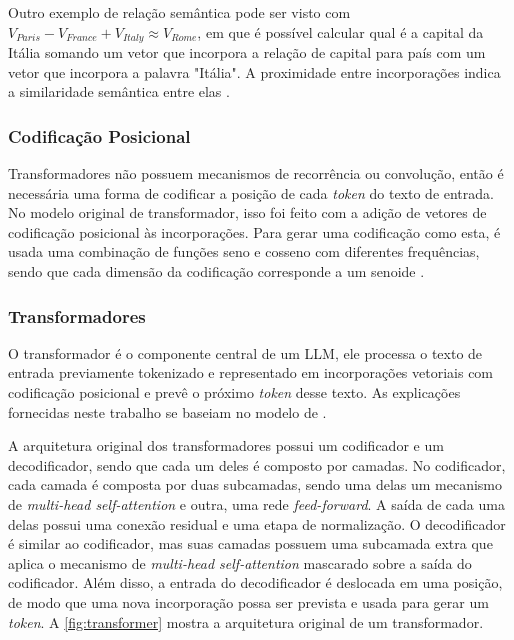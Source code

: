 Outro exemplo de relação semântica pode ser visto com \begin{math}V_{Paris} - V_{France} + V_{Italy} \approx V_{Rome}\end{math}, em que é possível calcular qual é a
capital da Itália somando um vetor que incorpora a relação de capital para país com um vetor que incorpora a palavra "Itália". A proximidade entre incorporações indica a
similaridade semântica entre elas \cite{word2vec_estimation}.

\subsubsection{Codificação Posicional}

Transformadores não possuem mecanismos de recorrência ou convolução, então é necessária uma forma de codificar a posição de cada \textit{token} do texto de entrada. No
modelo original de transformador, isso foi feito com a adição de vetores de codificação posicional às incorporações. Para gerar uma codificação como esta, é usada uma
combinação de funções seno e cosseno com diferentes frequências, sendo que cada dimensão da codificação corresponde a um senoide \cite{transformer}.


\subsubsection{Transformadores}

O transformador é o componente central de um \ac{LLM}, ele processa o texto de entrada previamente tokenizado e representado em incorporações vetoriais com codificação
posicional e prevê o próximo \textit{token} desse texto. As explicações fornecidas neste trabalho se baseiam no modelo de \textcite{transformer}.

A arquitetura original dos transformadores possui um codificador e um decodificador, sendo que cada um deles é composto por camadas. No codificador, cada camada é
composta por duas subcamadas, sendo uma delas um mecanismo de \textit{multi-head self-attention} e outra, uma rede \textit{feed-forward}. A saída de cada uma delas possui
uma conexão residual e uma etapa de normalização. O decodificador é similar ao codificador, mas suas camadas possuem uma subcamada extra que aplica o mecanismo de
\textit{multi-head self-attention} mascarado sobre a saída do codificador. Além disso, a entrada do decodificador é deslocada em uma posição, de modo que uma nova
incorporação possa ser prevista e usada para gerar um \textit{token}. A \autoref{fig:transformer} mostra a arquitetura original de um transformador.

